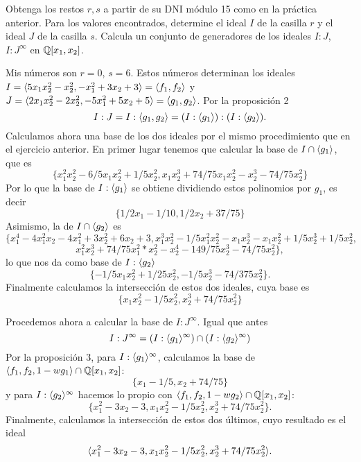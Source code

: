 \documentclass[twoside]{article}
\begin{document}
\begin{ejercicio}{2}
Obtenga los restos $r,s$ a partir de su DNI módulo 15 como en la práctica anterior. Para los valores encontrados, determine el ideal $I$ de la casilla $r$ y el ideal $J$ de la casilla $s$. Calcula un conjunto de generadores de los ideales $I:J$, $I:J^{\infty}$ en $\mathbb{Q}[x_1,x_2]$.
\end{ejercicio}
\begin{solucion}
Mis números son $r=0$, $s=6$. Estos números determinan los ideales $I=\langle{5x_1x_2^2-x_2^2,-x_1^2+3x_2+3}\rangle=\langle{f_1,f_2}\rangle$ y $J=\langle{2x_1x_2^2-2x_2^2,-5x_1^2+5x_2+5}\rangle=\langle{g_1,g_2}\rangle$. Por la proposición 2
\[
I:J=I:\langle{g_1,g_2}\rangle=(I:\langle{g_1}\rangle):(I:\langle{g_2}\rangle).
\]
Calculamos ahora una base de los dos ideales por el mismo procedimiento que en el ejercicio anterior. En primer lugar tenemos que calcular la base de $I\cap\langle{g_1}\rangle$, que es
\[
\{x_1^2x_2^2 - 6/5x_1x_2^2 + 1/5x_2^2, x_1x_2^3 + 74/75x_1x_2^2 - x_2^3 - 74/75x_2^2\}
\]
Por lo que la base de $I:\langle{g_1}\rangle$ se obtiene dividiendo estos polinomios por $g_1$, es decir
\[
\{1/2x_1 - 1/10,1/2x_2 + 37/75\}
\]
Asimismo, la de $I\cap\langle{g_2}\rangle$ es
\[
\{x_1^4 - 4x_1^2x_2 - 4x_1^2 + 3x_2^2 + 6x_2 + 3, x_1^3x_2^2 - 1/5x_1^2x_2^2 - x_1x_2^3 - x_1x_2^2 + 1/5x_2^3 + 1/5x_2^2,
\]
\[
 x_1^2x_2^3 + 74/75x_1^2*x_2^2 - x_2^4 - 149/75x_2^3 - 74/75x_2^2\},
\]
lo que nos da como base de $I:\langle{g_2}\rangle$
\[
\{-1/5x_1x_2^2 + 1/25x_2^2,-1/5x_2^3 - 74/375x_2^2\}.
\]
Finalmente calculamos la intersección de estos dos ideales, cuya base es
\[
\{x_1x_2^2 - 1/5x_2^2, x_2^3 + 74/75x_2^2\}
\]

Procedemos ahora a calcular la base de $I:J^{\infty}$. Igual que antes
\[
I:J^{\infty}=(I:\langle{g_1}\rangle^{\infty})\cap (I:\langle{g_2}\rangle^{\infty})
\]
Por la proposición 3, para $I:\langle{g_1}\rangle^{\infty}$, calculamos la base de $\langle{f_1,f_2,1-wg_1}\rangle\cap \mathbb{Q}[x_1,x_2]$:
\[
 \{x_1 - 1/5, x_2 + 74/75\}
\]
y para $I:\langle{g_2}\rangle^{\infty}$ hacemos lo propio con $\langle{f_1,f_2,1-wg_2}\rangle\cap \mathbb{Q}[x_1,x_2]$:
\[
\{x_1^2 - 3x_2 - 3, x_1x_2^2 - 1/5x_2^2, x_2^3 + 74/75x_2^2\}.
\]
Finalmente, calculamos la intersección de estos dos últimos, cuyo resultado es el ideal
\[
\langle{x_1^2 - 3x_2 - 3, x_1x_2^2 - 1/5x_2^2, x_2^3 + 74/75x_2^2}\rangle.
\]
\end{solucion}
\end{document}
